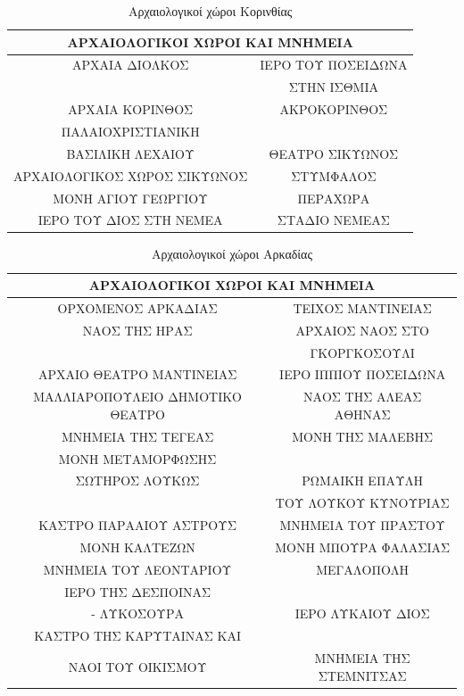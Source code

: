 \documentclass[12pt]{article}
\begin{document}
	\begin{table}[H]
		\centering
		\begin{tabular}{|c|c|}
			\hline
			\multicolumn{2}{|c|}{\textbf{ΑΡΧΑΙΟΛΟΓΙΚΟΙ ΧΩΡΟΙ ΚΑΙ ΜΝΗΜΕΙΑ}} \\ \hline
			ΑΡΧΑΙΑ ΔΙΟΛΚΟΣ & ΙΕΡΟ ΤΟΥ ΠΟΣΕΙΔΩΝΑ \\ & ΣΤΗΝ ΙΣΘΜΙΑ \\ \hline
			ΑΡΧΑΙΑ ΚΟΡΙΝΘΟΣ & ΑΚΡΟΚΟΡΙΝΘΟΣ \\ \hline
			ΠΑΛΑΙΟΧΡΙΣΤΙΑΝΙΚΗ & \\ ΒΑΣΙΛΙΚΗ ΛΕΧΑΙΟΥ & ΘΕΑΤΡΟ ΣΙΚΥΩΝΟΣ \\ \hline
			ΑΡΧΑΙΟΛΟΓΙΚΟΣ ΧΩΡΟΣ ΣΙΚΥΩΝΟΣ & ΣΤΥΜΦΑΛΟΣ \\ \hline
			ΜΟΝΗ ΑΓΙΟΥ ΓΕΩΡΓΙΟΥ & ΠΕΡΑΧΩΡΑ \\ \hline
			ΙΕΡΟ ΤΟΥ ΔΙΟΣ ΣΤΗ ΝΕΜΕΑ & ΣΤΑΔΙΟ ΝΕΜΕΑΣ \\ \hline
		\end{tabular}
		\caption{Αρχαιολογικοί χώροι Κορινθίας}
		\label{The label}
	\end{table}
	
	\begin{table}[H]
		\centering
		\begin{tabular}{|c|c|}
			\hline
			\multicolumn{2}{|c|}{\textbf{ΑΡΧΑΙΟΛΟΓΙΚΟΙ ΧΩΡΟΙ ΚΑΙ ΜΝΗΜΕΙΑ}} \\ \hline
			ΟΡΧΟΜΕΝΟΣ ΑΡΚΑΔΙΑΣ & ΤΕΙΧΟΣ ΜΑΝΤΙΝΕΙΑΣ \\ \hline
			ΝΑΟΣ ΤΗΣ ΗΡΑΣ & ΑΡΧΑΙΟΣ ΝΑΟΣ ΣΤΟ \\ & ΓΚΟΡΓΚΟΣΟΥΛΙ \\ \hline
			ΑΡΧΑΙΟ ΘΕΑΤΡΟ ΜΑΝΤΙΝΕΙΑΣ & ΙΕΡΟ ΙΠΠΙΟΥ ΠΟΣΕΙΔΩΝΑ \\ \hline
			ΜΑΛΛΙΑΡΟΠΟΥΛΕΙΟ ΔΗΜΟΤΙΚΟ ΘΕΑΤΡΟ & ΝΑΟΣ ΤΗΣ ΑΛΕΑΣ ΑΘΗΝΑΣ \\ \hline
			ΜΝΗΜΕΙΑ ΤΗΣ ΤΕΓΕΑΣ & ΜΟΝΗ ΤΗΣ ΜΑΛΕΒΗΣ \\ \hline
			ΜΟΝΗ ΜΕΤΑΜΟΡΦΩΣΗΣ & \\ΣΩΤΗΡΟΣ ΛΟΥΚΩΣ & ΡΩΜΑΙΚΗ ΕΠΑΥΛΗ \\ & ΤΟΥ ΛΟΥΚΟΥ ΚΥΝΟΥΡΙΑΣ \\ \hline
			ΚΑΣΤΡΟ ΠΑΡΑΑΙΟΥ ΑΣΤΡΟΥΣ & ΜΝΗΜΕΙΑ ΤΟΥ ΠΡΑΣΤΟΥ \\ \hline
			ΜΟΝΗ ΚΑΛΤΕΖΩΝ & ΜΟΝΗ ΜΠΟΥΡΑ ΦΑΛΑΣΙΑΣ \\ \hline
			ΜΝΗΜΕΙΑ ΤΟΥ ΛΕΟΝΤΑΡΙΟΥ & ΜΕΓΑΛΟΠΟΛΗ \\ \hline
			ΙΕΡΟ ΤΗΣ ΔΕΣΠΟΙΝΑΣ & \\ - ΛΥΚΟΣΟΥΡΑ & ΙΕΡΟ ΛΥΚΑΙΟΥ ΔΙΟΣ \\ \hline
			ΚΑΣΤΡΟ ΤΗΣ ΚΑΡΥΤΑΙΝΑΣ ΚΑΙ & \\ ΝΑΟΙ ΤΟΥ ΟΙΚΙΣΜΟΥ & ΜΝΗΜΕΙΑ ΤΗΣ ΣΤΕΜΝΙΤΣΑΣ \\ \hline
		\end{tabular}
		\caption{Αρχαιολογικοί χώροι Αρκαδίας}
		\label{The label}
	\end{table}
	
\end{document}
